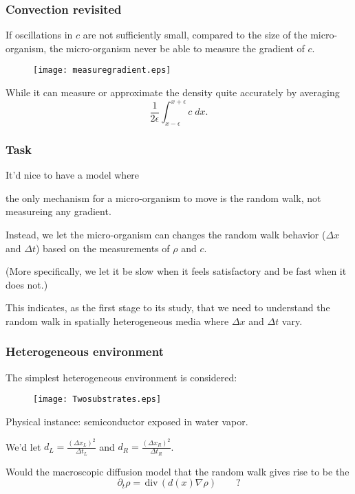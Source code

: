\documentclass{beamer}
\def\red{\color{red}}
\def\blue{\color{blue}}
\def\div{\,\textrm{div}\,}
\begin{document}
\begin{frame}
 \frametitle{Convection revisited}
 
 If oscillations in $c$ are not sufficiently small, compared to the size of the micro-organism, the micro-organism never be able to measure the {\blue gradient of $c$}.

    \begin{figure}
    \centering
    \texttt{[image: measuregradient.eps]}
    \end{figure}
    
 While it can measure or approximate the density quite accurately by averaging 
 $$\frac{1}{2\epsilon} \int_{x-\epsilon}^{x+\epsilon} c \; dx.$$
\end{frame}

\begin{frame}
 \frametitle{Task}

 It'd nice to have a model where
 
 {\blue the only mechanism} for a micro-organism to move is the {\red random walk}, not measureing any gradient.
 
 Instead, we let the micro-organism can changes the random walk behavior ($\Delta x$ and $\Delta t$) based on the measurements of $\rho$ and $c$. 
 
 ({\blue \scriptsize More specifically, we let it be slow when it feels satisfactory and be fast when it does not.})
 
 \vfill
 This indicates, as the first stage to its study, that we need to understand the {\red random walk in spatially heterogeneous media where $\Delta x$ and $\Delta t$ vary}.
 
 \end{frame}

 
\begin{frame}
 \frametitle{Heterogeneous environment}
 The simplest heterogeneous environment is considered:
 
 \begin{figure}
  \centering
  \texttt{[image: Twosubstrates.eps]}
 \end{figure}
 Physical instance: semiconductor exposed in water vapor.

 \vfill
 We'd let $d_L = \frac{(\Delta x_L)^2}{\Delta t_L}$ and $d_R = \frac{(\Delta x_R)^2}{\Delta t_R}$.
 
 
 Would the macroscopic diffusion model that the random walk gives rise to be the 
 $$ \partial_t \rho = \div (d(x) \nabla \rho) \quad \quad?$$
 
 \end{frame} 
 
\end{document}
